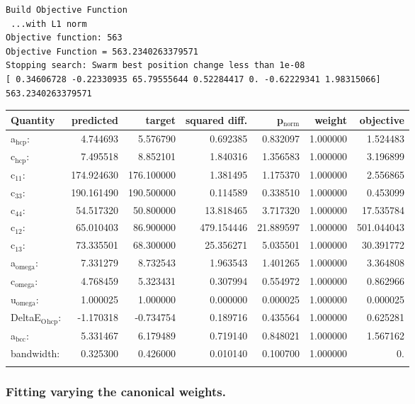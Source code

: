 \documentclass[11pt]{article}
\begin{document}
\begin{verbatim}
Build Objective Function
 ...with L1 norm 
Objective function: 563 
Objective Function = 563.2340263379571 
Stopping search: Swarm best position change less than 1e-08 
[ 0.34606728 -0.22330935 65.79555644 0.52284417 0. -0.62229341 1.98315066] 
563.2340263379571
\end{verbatim}

\begin{center}
\begin{tabular}{lrrrrrr}
Quantity & predicted & target & squared diff. & p$_{\text{norm}}$ & weight & objective\\
\hline
a$_{\text{hcp}}$: & 4.744693 & 5.576790 & 0.692385 & 0.832097 & 1.000000 & 1.524483\\
c$_{\text{hcp}}$: & 7.495518 & 8.852101 & 1.840316 & 1.356583 & 1.000000 & 3.196899\\
c$_{\text{11}}$: & 174.924630 & 176.100000 & 1.381495 & 1.175370 & 1.000000 & 2.556865\\
c$_{\text{33}}$: & 190.161490 & 190.500000 & 0.114589 & 0.338510 & 1.000000 & 0.453099\\
c$_{\text{44}}$: & 54.517320 & 50.800000 & 13.818465 & 3.717320 & 1.000000 & 17.535784\\
c$_{\text{12}}$: & 65.010403 & 86.900000 & 479.154446 & 21.889597 & 1.000000 & 501.044043\\
c$_{\text{13}}$: & 73.335501 & 68.300000 & 25.356271 & 5.035501 & 1.000000 & 30.391772\\
a$_{\text{omega}}$: & 7.331279 & 8.732543 & 1.963543 & 1.401265 & 1.000000 & 3.364808\\
c$_{\text{omega}}$: & 4.768459 & 5.323431 & 0.307994 & 0.554972 & 1.000000 & 0.862966\\
u$_{\text{omega}}$: & 1.000025 & 1.000000 & 0.000000 & 0.000025 & 1.000000 & 0.000025\\
DeltaE$_{\text{O}}$$_{\text{hcp}}$: & -1.170318 & -0.734754 & 0.189716 & 0.435564 & 1.000000 & 0.625281\\
a$_{\text{bcc}}$: & 5.331467 & 6.179489 & 0.719140 & 0.848021 & 1.000000 & 1.567162\\
bandwidth: & 0.325300 & 0.426000 & 0.010140 & 0.100700 & 1.000000 & 0.\\
 &  &  &  &  &  & \\
\end{tabular}
\end{center}
\subsubsection{Fitting varying the canonical weights.}
\label{sec-2-7-1}
\end{document}
